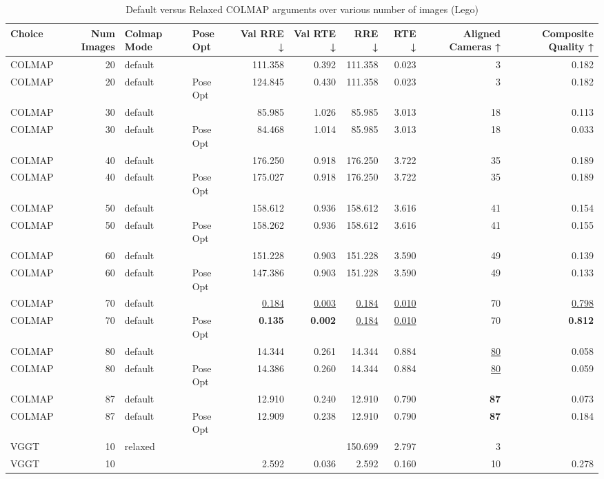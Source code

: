 \begin{table}[H]
\caption{Default versus Relaxed COLMAP arguments over various number of images (Lego)}
\label{tab:08_colmap_mode_lego}
\begin{tabular}{lrllrrrrrr}
\toprule
Choice & Num Images & Colmap Mode & Pose Opt & Val RRE ↓ & Val RTE ↓ & RRE ↓ & RTE ↓ & Aligned Cameras ↑ & Composite Quality ↑ \\
\midrule
COLMAP & 20 & default &  & 111.358 & 0.392 & 111.358 & 0.023 & 3 & 0.182 \\
COLMAP & 20 & default & Pose Opt & 124.845 & 0.430 & 111.358 & 0.023 & 3 & 0.182 \\
COLMAP & 30 & default &  & 85.985 & 1.026 & 85.985 & 3.013 & 18 & 0.113 \\
COLMAP & 30 & default & Pose Opt & 84.468 & 1.014 & 85.985 & 3.013 & 18 & 0.033 \\
COLMAP & 40 & default &  & 176.250 & 0.918 & 176.250 & 3.722 & 35 & 0.189 \\
COLMAP & 40 & default & Pose Opt & 175.027 & 0.918 & 176.250 & 3.722 & 35 & 0.189 \\
COLMAP & 50 & default &  & 158.612 & 0.936 & 158.612 & 3.616 & 41 & 0.154 \\
COLMAP & 50 & default & Pose Opt & 158.262 & 0.936 & 158.612 & 3.616 & 41 & 0.155 \\
COLMAP & 60 & default &  & 151.228 & 0.903 & 151.228 & 3.590 & 49 & 0.139 \\
COLMAP & 60 & default & Pose Opt & 147.386 & 0.903 & 151.228 & 3.590 & 49 & 0.133 \\
COLMAP & 70 & default &  & \underline{0.184} & \underline{0.003} & \underline{0.184} & \underline{0.010} & 70 & \underline{0.798} \\
COLMAP & 70 & default & Pose Opt & \textbf{0.135} & \textbf{0.002} & \underline{0.184} & \underline{0.010} & 70 & \textbf{0.812} \\
COLMAP & 80 & default &  & 14.344 & 0.261 & 14.344 & 0.884 & \underline{80} & 0.058 \\
COLMAP & 80 & default & Pose Opt & 14.386 & 0.260 & 14.344 & 0.884 & \underline{80} & 0.059 \\
COLMAP & 87 & default &  & 12.910 & 0.240 & 12.910 & 0.790 & \textbf{87} & 0.073 \\
COLMAP & 87 & default & Pose Opt & 12.909 & 0.238 & 12.910 & 0.790 & \textbf{87} & 0.184 \\
VGGT & 10 & relaxed &  &  &  & 150.699 & 2.797 & 3 &  \\
VGGT & 10 &  &  & 2.592 & 0.036 & 2.592 & 0.160 & 10 & 0.278 \\

\end{tabular}
\end{table}
